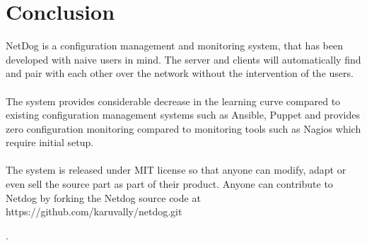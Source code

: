 \chapter{Conclusion}

\par
NetDog is a configuration management and monitoring system, that has been
developed with naive users in mind. The server and clients will automatically
find and pair with each other over the network without the intervention of the
users.
\\\\
The system provides considerable decrease in the learning curve compared to
existing configuration management systems such as Ansible, Puppet and provides
zero configuration monitoring compared to monitoring tools such as Nagios which
require initial setup.
\\\\
The system is released under MIT license so that anyone can modify, adapt or
even sell the source part as part of their product. Anyone can contribute to
Netdog by forking the Netdog source code at https://github.com/karuvally/netdog.git

.
